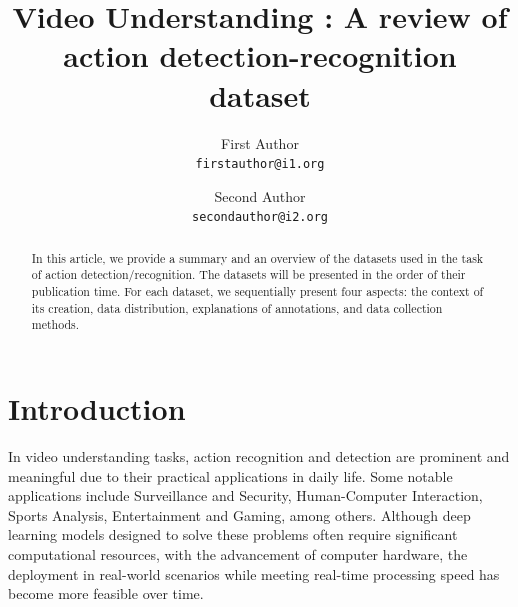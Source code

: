 \documentclass[10pt,onecolumn,letterpaper]{article}
\begin{document}
	
	\title{Video Understanding : A review of action detection-recognition dataset}
	
	\author{First Author\\
		{\tt\small firstauthor@i1.org}
	\and
	Second Author\\
	{\tt\small secondauthor@i2.org}
}
\maketitle

\tableofcontents

\begin{abstract}
	In this article, we provide a summary and an overview of the datasets used in
	the task of action detection/recognition. The datasets will be presented in the
	order of their publication time. For each dataset, we sequentially present four
	aspects: the context of its creation, data distribution, explanations of
	annotations, and data collection methods. \\
\end{abstract}

\section{Introduction}
In video understanding tasks, action recognition and detection are prominent and
meaningful due to their practical applications in daily life. Some notable
applications include Surveillance and Security, Human-Computer Interaction,
Sports Analysis, Entertainment and Gaming, among others. Although deep learning
models designed to solve these problems often require significant computational
resources, with the advancement of computer hardware, the deployment in
real-world scenarios while meeting real-time processing speed has become more
feasible over time.
\end{document}
